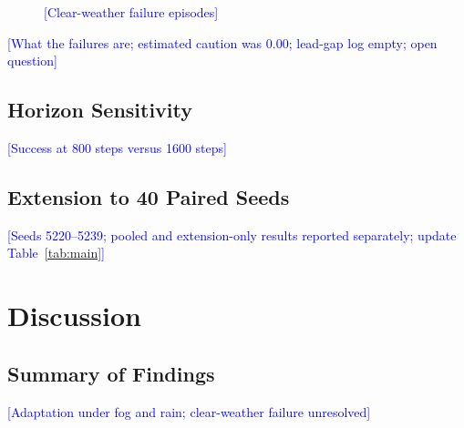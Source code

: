 \documentclass[conference]{IEEEtran}
\newcommand{\placeholder}[1]{\textcolor{blue}{[#1]}}
\newcommand{\figslot}[2]{\fbox{\parbox[c][#2][c]{0.94\columnwidth}{\centering\textcolor{blue}{FIGURE SLOT\\[1mm]#1}}}}
\begin{document}
\begin{table}[t]
\centering
\caption{\placeholder{Model C failures in clear weather}}
\label{tab:fail}
\end{table}

\begin{figure}[t]
\centering
\figslot{OPTIONAL: speed and throttle traces of the three failures versus Model A on the same seeds}{55mm}
\caption{\placeholder{Clear-weather failure episodes}}
\label{fig:failtraces}
\end{figure}

\placeholder{What the failures are; estimated caution was 0.00; lead-gap log empty; open question}

\subsection{Horizon Sensitivity}
\placeholder{Success at 800 steps versus 1600 steps}

\begin{table}[t]
\centering
\caption{\placeholder{Success at horizon 800 and 1600}}
\label{tab:horizon}
\end{table}

\subsection{Extension to 40 Paired Seeds}
\placeholder{Seeds 5220--5239; pooled and extension-only results reported separately; update Table~\ref{tab:main}}

\section{Discussion}\label{sec:discussion}
\subsection{Summary of Findings}
\placeholder{Adaptation under fog and rain; clear-weather failure unresolved}
\end{document}
